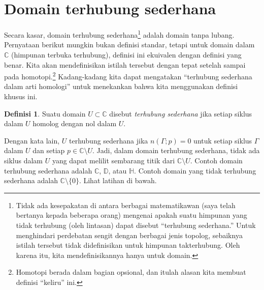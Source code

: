 \documentclass[12pt,openany]{book}
\newcommand{\C}{{\mathbb{C}}}
\newcommand{\D}{{\mathbb{D}}}
\newcommand{\bH}{{\mathbb{H}}}
\newcommand{\myquote}[1]{``#1''}
\theoremstyle{plain}
\theoremstyle{remark}
\theoremstyle{definition}
\newtheorem{defn}[thm]{Definisi}
\theoremstyle{exercise}
\theoremstyle{example}
\begin{document}

\section{Domain terhubung sederhana}

Secara kasar, domain terhubung sederhana\footnote{%
Tidak ada kesepakatan di antara berbagai matematikawan (saya telah bertanya kepada beberapa orang) mengenai apakah
suatu himpunan yang tidak terhubung (oleh lintasan) dapat disebut \myquote{terhubung sederhana.}
Untuk menghindari perdebatan sengit dengan berbagai jenis topolog,
sebaiknya istilah tersebut tidak didefinisikan untuk himpunan takterhubung.
Oleh karena itu, kita mendefinisikannya hanya untuk domain.}
adalah domain tanpa lubang.  Pernyataan berikut
mungkin bukan definisi standar, tetapi untuk domain dalam $\C$
(himpunan terbuka terhubung),
definisi ini ekuivalen dengan definisi yang benar.
Kita akan mendefinisikan istilah tersebut dengan tepat setelah sampai pada
homotopi.\footnote{Homotopi berada dalam bagian opsional, dan itulah
alasan kita membuat definisi \myquote{keliru} ini.}
Kadang-kadang kita dapat mengatakan
\myquote{terhubung sederhana dalam arti homologi}
untuk menekankan bahwa kita menggunakan definisi khusus ini.

\begin{defn} \label{defn:simplyconnected:homology}
Suatu domain $U \subset \C$ disebut \emph{terhubung sederhana}%
jika setiap siklus dalam $U$
homolog dengan nol dalam $U$.
\end{defn}

Dengan kata lain, $U$ terhubung sederhana
jika $n(\Gamma;p) = 0$ untuk setiap siklus $\Gamma$ dalam $U$ dan
setiap $p \in \C \setminus U$.
Jadi, dalam domain terhubung sederhana, tidak ada siklus dalam $U$ yang dapat melilit sembarang titik
dari $\C \setminus U$.  Contoh domain terhubung sederhana adalah $\C$, $\D$, atau
$\bH$.  Contoh domain yang tidak terhubung sederhana adalah
$\C \setminus \{ 0 \}$.
Lihat latihan di bawah.
\end{document}
